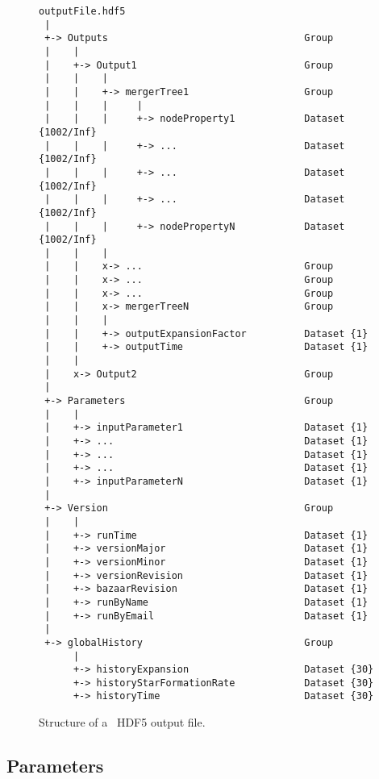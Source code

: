 \begin{figure}
\begin{center}
\begin{verbatim}
outputFile.hdf5
 |
 +-> Outputs                                  Group
 |    |
 |    +-> Output1                             Group
 |    |    |
 |    |    +-> mergerTree1                    Group
 |    |    |     |
 |    |    |     +-> nodeProperty1            Dataset {1002/Inf}
 |    |    |     +-> ...                      Dataset {1002/Inf}
 |    |    |     +-> ...                      Dataset {1002/Inf}
 |    |    |     +-> ...                      Dataset {1002/Inf}
 |    |    |     +-> nodePropertyN            Dataset {1002/Inf}
 |    |    |
 |    |    x-> ...                            Group
 |    |    x-> ...                            Group
 |    |    x-> ...                            Group
 |    |    x-> mergerTreeN                    Group
 |    |    |
 |    |    +-> outputExpansionFactor          Dataset {1}
 |    |    +-> outputTime                     Dataset {1}
 |    |
 |    x-> Output2                             Group
 |
 +-> Parameters                               Group
 |    |
 |    +-> inputParameter1                     Dataset {1}
 |    +-> ...                                 Dataset {1}
 |    +-> ...                                 Dataset {1}
 |    +-> ...                                 Dataset {1}
 |    +-> inputParameterN                     Dataset {1}
 |
 +-> Version                                  Group
 |    |
 |    +-> runTime                             Dataset {1}
 |    +-> versionMajor                        Dataset {1}
 |    +-> versionMinor                        Dataset {1}
 |    +-> versionRevision                     Dataset {1}
 |    +-> bazaarRevision                      Dataset {1}
 |    +-> runByName                           Dataset {1}
 |    +-> runByEmail                          Dataset {1}
 |
 +-> globalHistory                            Group
      |
      +-> historyExpansion                    Dataset {30}
      +-> historyStarFormationRate            Dataset {30}
      +-> historyTime                         Dataset {30}
\end{verbatim}
\end{center}
\caption{Structure of a \glc\ HDF5 output file.}
\label{fig:glcOutputFileStructure}
\end{figure}

\subsection{Parameters}

